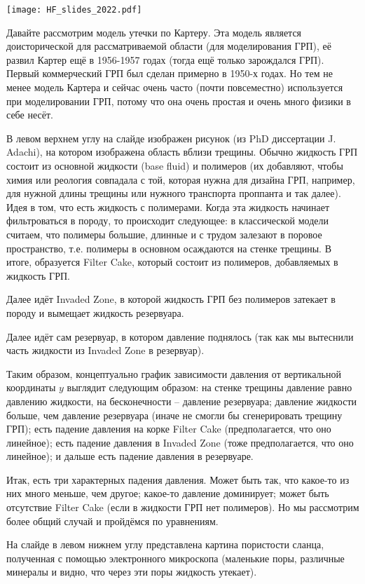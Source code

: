 \documentclass[main.tex]{subfiles}
\begin{document}
\texttt{[image: HF\_slides\_2022.pdf]}

Давайте рассмотрим модель утечки по Картеру.
Эта модель является доисторической для рассматриваемой области (для моделирования ГРП), её развил Картер ещё в 1956-1957 годах (тогда ещё только зарождался ГРП).
Первый коммерческий ГРП был сделан примерно в 1950-х годах.
Но тем не менее модель Картера и сейчас очень часто (почти повсеместно) используется при моделировании ГРП, потому что она очень простая и очень много физики в себе несёт.

В левом верхнем углу на слайде изображен рисунок (из PhD диссертации J. Adachi), на котором изображена область вблизи трещины.
Обычно жидкость ГРП состоит из основной жидкости (base fluid) и полимеров (их добавляют, чтобы химия или реология совпадала с той, которая нужна для дизайна ГРП, например, для нужной длины трещины или нужного транспорта проппанта и так далее).
Идея в том, что есть жидкость с полимерами.
Когда эта жидкость начинает фильтроваться в породу, то происходит следующее: в классической модели считаем, что полимеры большие, длинные и с трудом залезают в поровое пространство, т.е. полимеры в основном осаждаются на стенке трещины.
В итоге, образуется Filter Cake, который состоит из полимеров, добавляемых в жидкость ГРП.

Далее идёт Invaded Zone, в которой жидкость ГРП без полимеров затекает в породу и вымещает жидкость резервуара.

Далее идёт сам резервуар, в котором давление поднялось (так как мы вытеснили часть жидкости из Invaded Zone в резервуар).

Таким образом, концептуально график зависимости давления от вертикальной координаты $y$ выглядит следующим образом: на стенке трещины давление равно давлению жидкости, на бесконечности -- давление резервуара; 
давление жидкости больше, чем давление резервуара (иначе не смогли бы сгенерировать трещину ГРП);
есть падение давления на корке Filter Cake (предполагается, что оно линейное);
есть падение давления в Invaded Zone (тоже предполагается, что оно линейное);
и дальше есть падение давления в резервуаре.

Итак, есть три характерных падения давления.
Может быть так, что какое-то из них много меньше, чем другое; какое-то давление доминирует; может быть отсутствие Filter Cake (если в жидкости ГРП нет полимеров).
Но мы рассмотрим более общий случай и пройдёмся по уравнениям.

На слайде в левом нижнем углу представлена картина пористости сланца, полученная с помощью электронного микроскопа (маленькие поры, различные минералы и видно, что через эти поры жидкость утекает).
\\
\end{document}
